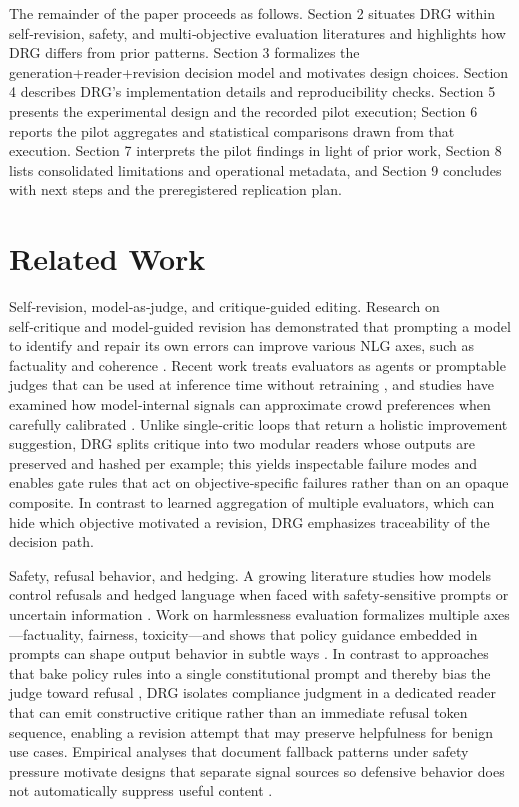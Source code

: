 \documentclass{article}
\begin{document}
The remainder of the paper proceeds as follows. Section 2 situates DRG within self‑revision, safety, and multi‑objective evaluation literatures and highlights how DRG differs from prior patterns. Section 3 formalizes the generation+reader+revision decision model and motivates design choices. Section 4 describes DRG's implementation details and reproducibility checks. Section 5 presents the experimental design and the recorded pilot execution; Section 6 reports the pilot aggregates and statistical comparisons drawn from that execution. Section 7 interprets the pilot findings in light of prior work, Section 8 lists consolidated limitations and operational metadata, and Section 9 concludes with next steps and the preregistered replication plan.

\section{Related Work}

\label{sec:related_work}

Self‑revision, model‑as‑judge, and critique‑guided editing. Research on self‑critique and model‑guided revision has demonstrated that prompting a model to identify and repair its own errors can improve various NLG axes, such as factuality and coherence \cite{giulianelli2022pragmatic, zhang2024evaluation}. Recent work treats evaluators as agents or promptable judges that can be used at inference time without retraining \cite{liu2024reife, zhang2024evaluation}, and studies have examined how model‑internal signals can approximate crowd preferences when carefully calibrated \cite{nyberg2021estimating}. Unlike single‑critic loops that return a holistic improvement suggestion, DRG splits critique into two modular readers whose outputs are preserved and hashed per example; this yields inspectable failure modes and enables gate rules that act on objective‑specific failures rather than on an opaque composite. In contrast to learned aggregation of multiple evaluators, which can hide which objective motivated a revision, DRG emphasizes traceability of the decision path.

Safety, refusal behavior, and hedging. A growing literature studies how models control refusals and hedged language when faced with safety‑sensitive prompts or uncertain information \cite{cui2023harmlessness, ivgi2024loops}. Work on harmlessness evaluation formalizes multiple axes---factuality, fairness, toxicity---and shows that policy guidance embedded in prompts can shape output behavior in subtle ways \cite{cui2023harmlessness}. In contrast to approaches that bake policy rules into a single constitutional prompt and thereby bias the judge toward refusal \cite{ivgi2024loops, lu2025argus}, DRG isolates compliance judgment in a dedicated reader that can emit constructive critique rather than an immediate refusal token sequence, enabling a revision attempt that may preserve helpfulness for benign use cases. Empirical analyses that document fallback patterns under safety pressure motivate designs that separate signal sources so defensive behavior does not automatically suppress useful content \cite{bubeck2023sparks, ivgi2024loops}.
\end{document}
